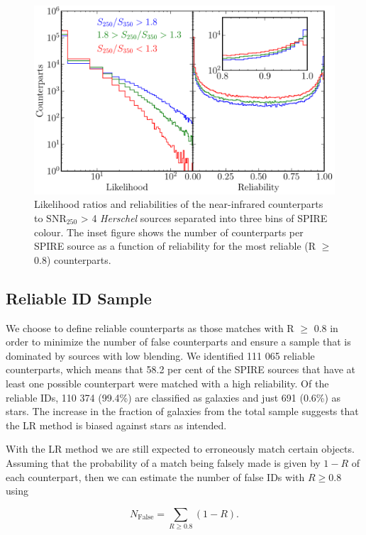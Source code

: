 \documentclass[fleqn,usenatbib]{mnras}
\begin{document}
\begin{figure}
	\includegraphics[width=\columnwidth]{Fig_4}
	\caption{Likelihood ratios and reliabilities of the near-infrared counterparts to $\textrm{SNR}_{250}$ > 4 \textit{Herschel} sources separated into three bins of SPIRE colour. The inset figure shows the number of counterparts per SPIRE source as a function of reliability for the most reliable (R $\geq$ 0.8) counterparts.}
	\label{fig:lr_reliability}
\end{figure}

\subsection{Reliable ID Sample}
\label{sec:reliable_id_sample}

We choose to define reliable counterparts as those matches with R $\geq$ 0.8 in order to minimize the number of false counterparts and ensure a sample that is dominated by sources with low blending. We identified 111 065 reliable counterparts, which means that 58.2 per cent of the SPIRE sources that have at least one possible counterpart were matched with a high reliability. Of the reliable IDs, 110 374 (99.4\%) are classified as galaxies and just 691 (0.6\%) as stars. The increase in the fraction of galaxies from the total sample suggests that the LR method is biased against stars as intended.

With the LR method we are still expected to erroneously match certain objects. Assuming that the probability of a match being falsely made is given by $1 - R$ of each counterpart, then we can estimate the number of false IDs with $R \geq 0.8$ using

\begin{equation}
N_{\textrm{False}} = \sum_{R \geq 0.8} (1 - R).
\end{equation}
\end{document}
